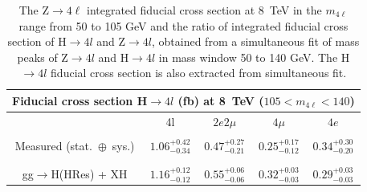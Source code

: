 \begin{table}[!h!tb]
\begin{center}
      \caption{ The Z$\rightarrow 4\ell$ integrated fiducial cross section at 8~TeV in the $m_{4\ell}$ range from 50 to
105 GeV and the ratio of integrated fiducial cross section of H$\rightarrow 4l$ and Z$\rightarrow 4l$, obtained
from a simultaneous fit of mass peaks of Z$\rightarrow 4l$ and H$\rightarrow 4l$ in mass window 50 to 140 GeV. The   H$\rightarrow 4l$
fiducial cross section  is also extracted from simultaneous fit.
        } \label{tab:incresults-simfit}

\begin{tabular}{|c|c|c|c|c|}
\hline %
\hline %
\multicolumn{5}{|l|}{ Fiducial cross section H$\rightarrow 4l$ (fb) at 8~TeV  ($105 < m_{4\ell} < 140$) } \\
\hline %
& 4l & $2e2\mu$ & $4\mu$ & $4e$ \\
\hline %
\vspace{-0.4cm} &&&&\\
Measured (stat.~$\oplus$~sys.)
&$1.06^{+0.42}_{-0.34}$
&$0.47^{+0.27}_{-0.21}$
&$0.25^{+0.17}_{-0.12}$
&$0.34^{+0.30}_{-0.20}$
\\
\vspace{-0.4cm} &&&&\\
\hline %
\vspace{-0.4cm} &&&&\\
\small gg$\rightarrow$H({\sc HRes}) + XH
& $1.16^{+0.12}_{-0.12}$  & $0.55^{+0.06}_{-0.06}$  & $0.32^{+0.03}_{-0.03}$  & $0.29^{+0.03}_{-0.03}$  


\end{tabular}
\end{center}
\end{table}
